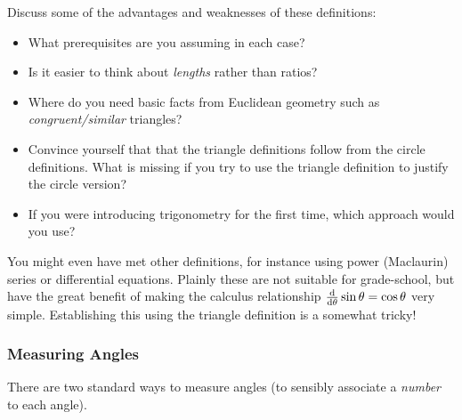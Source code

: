 \pagebreak[3]

Discuss some of the advantages and weaknesses of these definitions:
\begin{itemize}
  \item What prerequisites are you assuming in each case?
  \item Is it easier to think about \emph{lengths} rather than ratios?
  \item Where do you need basic facts from Euclidean geometry such as \emph{congruent/similar} triangles?
  \item Convince yourself that that the triangle definitions follow from the circle definitions. What is missing if you try to use the triangle definition to justify the circle version?
  \item If you were introducing trigonometry for the first time, which approach would you use?
\end{itemize}

You might even have met other definitions, for instance using power (Maclaurin) series or differential equations. Plainly these are not suitable for grade-school, but have the great benefit of making the calculus relationship $\frac{\mathrm{d} }{\mathrm{d} \theta}\sin\theta=\cos\theta$ very simple. Establishing this using the triangle definition is a somewhat tricky!


\subsubsection*{Measuring Angles}

There are two standard ways to measure angles (to sensibly associate a \emph{number} to each angle).

